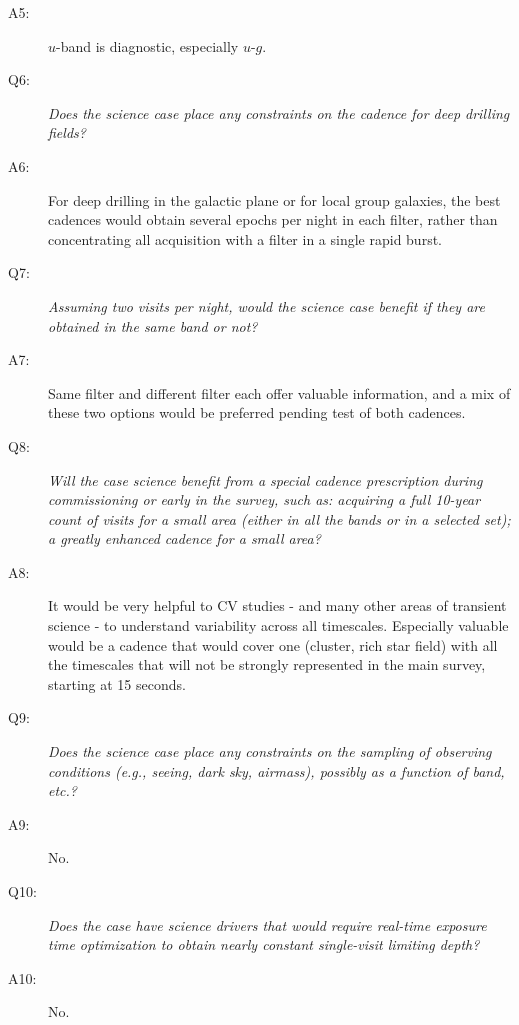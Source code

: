 \begin{description}
 \item[A5:] $u$-band is diagnostic, especially $u$-$g$.

 \item[Q6:] {\it Does the science case place any constraints on the
 cadence for deep drilling fields?}

 \item[A6:] For deep drilling in the galactic plane or for local group galaxies, the best cadences would obtain several epochs  per night in
 each filter, rather than concentrating all acquisition with a filter in a single rapid burst.

 \item[Q7:] {\it Assuming two visits per night, would the science case
 benefit if they are obtained in the same band or not?}

 \item[A7:] Same filter and different filter each offer valuable information, and a mix of these two options would be preferred
pending test of both cadences.

 \item[Q8:] {\it Will the case science benefit from a special cadence
 prescription during commissioning or early in the survey, such as:
 acquiring a full 10-year count of visits for a small area (either in all
 the bands or in a  selected set); a greatly enhanced cadence for a small
 area?}

 \item[A8:] It would be very helpful to CV studies - and many other areas of transient science - to understand variability across all timescales.
 Especially valuable would be a cadence that would cover one (cluster, rich star field) with all the timescales that will not be
strongly represented  in the main survey, starting at 15 seconds.

 \item[Q9:] {\it Does the science case place any constraints on the
 sampling of observing conditions (e.g., seeing, dark sky, airmass),
 possibly as a function of band, etc.?}

 \item[A9:] No.

 \item[Q10:] {\it Does the case have science drivers that would require
 real-time exposure time optimization to obtain nearly constant
 single-visit limiting depth?}

 \item[A10:] No.

 \end{description}

 \navigationbar
